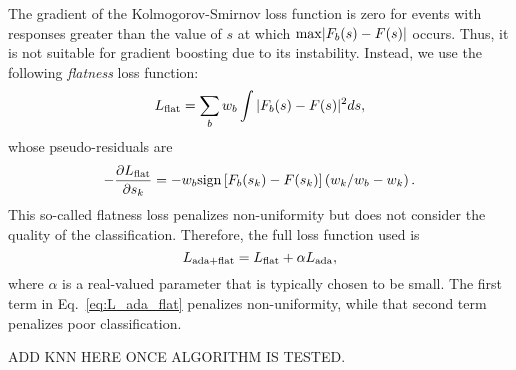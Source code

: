 The gradient of the Kolmogorov-Smirnov loss function is zero for events with responses greater than the value of $s$ at which ${\rm max}|F_b(s)-F(s)|$ occurs.  Thus, it is not suitable for gradient boosting due to its instability.  Instead, we use the following {\em flatness} loss function:
\begin{equation}
  L_{\rm flat} = \sum\limits_{b} w_b \int |F_b(s)-F(s)|^2 ds,
\end{equation}
whose pseudo-residuals are
\begin{equation}
 -\frac{\partial L_{\rm flat}}{\partial s_k} = - w_b {\rm sign}\left[F_b(s_k)-F(s_k)\right] \left( w_k/w_b - w_k \right).  
\end{equation}
This so-called flatness loss penalizes non-uniformity but does not consider the quality of the classification.  Therefore, the full loss function used is 
\begin{equation}
\label{eq:L_ada_flat}
  L_{{\rm ada}+{\rm flat}} = L_{\rm flat} + \alpha L_{\rm ada},
\end{equation}  
where $\alpha$ is a real-valued parameter that is typically chosen to be small.  The first term in Eq.~\ref{eq:L_ada_flat} penalizes non-uniformity, while that second term penalizes poor classification.  

ADD KNN HERE ONCE ALGORITHM IS TESTED.
